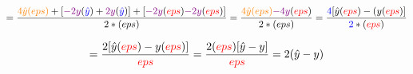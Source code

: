 \documentclass{article}
\begin{document}
\begin{displaymath}
=\frac{\textcolor{orange}{4\hat{y}(eps)}+[\textcolor{violet}{-2y}
(\textcolor{blue}{\hat{y}})+\textcolor{violet}{2y}
(\textcolor{blue}{\hat{y}})]+[\textcolor{violet}{-2y}
(\textcolor{red}{eps})\textcolor{violet}{-2y}
(\textcolor{red}{eps})]}{2*(eps)}
=\frac{\textcolor{orange}{4\hat{y}(eps)}\textcolor{violet}{-4y}
(\textcolor{red}{eps})}{2*(eps)}
=\frac{\textcolor{blue}{4}[\hat{y}(\textcolor{red}{eps})-
(y(\textcolor{red}{eps})]}
{\textcolor{blue}{2}*(\textcolor{red}{eps})}
\end{displaymath}

\begin{displaymath}
=\frac{2[\hat{y}(\textcolor{red}{eps})-y(\textcolor{red}{eps})]}
{\textcolor{red}{eps}}
=\frac{2(\textcolor{red}{eps})[\hat{y}-y]}
{\textcolor{red}{eps}}
=2(\hat{y}-y)
\end{displaymath}
\end{document}

